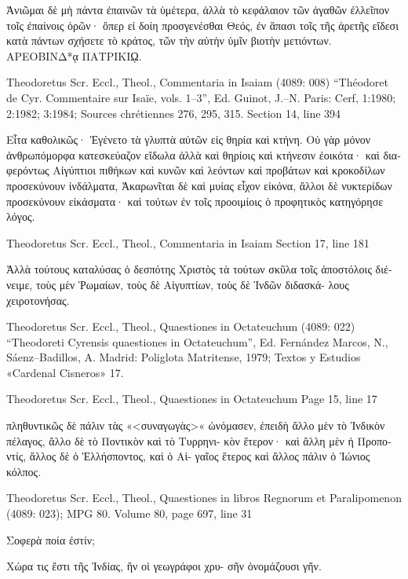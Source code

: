 \documentclass[12pt,letterpaper,twoside,final]{memoir}
\begin{document}
\begin{greek}
                  Ἀνιῶμαι δὲ μὴ πάντα ἐπαινῶν τὰ ὑμέτερα, 
ἀλλὰ τὸ κεφάλαιον τῶν ἀγαθῶν ἐλλεῖπον τοῖς ἐπαίνοις ὁρῶν· 
ὅπερ εἰ δοίη προσγενέσθαι Θεός, ἐν ἅπασι τοῖς τῆς ἀρετῆς 
εἴδεσι κατὰ πάντων σχήσετε τὸ κράτος, τῶν τὴν αὐτὴν ὑμῖν 
βιοτὴν μετιόντων.   
ΑΡΕΟΒΙΝΔ*ᾳ ΠΑΤΡΙΚΙῼ. 




Theodoretus Scr. Eccl., Theol., Commentaria in Isaiam (4089: 008)
“Théodoret de Cyr. Commentaire sur Isaïe, vols. 1–3”, Ed. Guinot, J.–N.
Paris: Cerf, 1:1980; 2:1982; 3:1984; Sources chrétiennes 276, 295, 315.
Section 14, line 394

                         Εἶτα καθολικῶς· Ἐγένετο τὰ γλυπτὰ 
αὐτῶν εἰς θηρία καὶ κτήνη. Οὐ γὰρ μόνον ἀνθρωπόμορφα 
κατεσκεύαζον εἴδωλα ἀλλὰ καὶ θηρίοις καὶ κτήνεσιν ἐοικότα· 
καὶ διαφερόντως Αἰγύπτιοι πιθήκων καὶ κυνῶν καὶ λεόντων 
καὶ προβάτων καὶ κροκοδίλων προσεκύνουν ἰνδάλματα, 
Ἀκαρωνῖται δὲ καὶ μυίας εἶχον εἰκόνα, ἄλλοι δὲ νυκτερίδων 
προσεκύνουν εἰκάσματα· καὶ τούτων ἐν τοῖς προοιμίοις ὁ 
προφητικὸς κατηγόρησε λόγος. 



Theodoretus Scr. Eccl., Theol., Commentaria in Isaiam 
Section 17, line 181

                    Ἀλλὰ τούτους καταλύσας ὁ δεσπότης 
Χριστὸς τὰ τούτων σκῦλα τοῖς ἀποστόλοις διένειμε, τοὺς 
μὲν Ῥωμαίων, τοὺς δὲ Αἰγυπτίων, τοὺς δὲ Ἰνδῶν διδασκά-
λους χειροτονήσας. 


Theodoretus Scr. Eccl., Theol., Quaestiones in Octateuchum (4089: 022)
“Theodoreti Cyrensis quaestiones in Octateuchum”, Ed. Fernández Marcos, N., Sáenz–Badillos, A.
Madrid: Poliglota Matritense, 1979; Textos y Estudios «Cardenal Cisneros» 17.


Theodoretus Scr. Eccl., Theol., Quaestiones in Octateuchum 
Page 15, line 17

              πληθυντικῶς δὲ πάλιν τὰς «<συναγωγὰς>« ὠνόμασεν, 
ἐπειδὴ ἄλλο μὲν τὸ Ἰνδικὸν πέλαγος, ἄλλο δὲ τὸ Ποντικὸν καὶ τὸ Τυρρηνι-
κὸν ἕτερον· καὶ ἄλλη μὲν ἡ Προποντίς, ἄλλος δὲ ὁ Ἑλλήσποντος, καὶ ὁ Αἰ-
γαῖος ἕτερος καὶ ἄλλος πάλιν ὁ Ἰώνιος κόλπος. 



Theodoretus Scr. Eccl., Theol., Quaestiones in libros Regnorum et Paralipomenon (4089: 023); MPG 80.
Volume 80, page 697, line 31

Σοφερὰ ποία ἐστίν;


 Χώρα τις ἔστι τῆς Ἰνδίας, ἣν οἱ γεωγράφοι χρυ-
σῆν ὀνομάζουσι γῆν. 




\end{greek}
\end{document}

